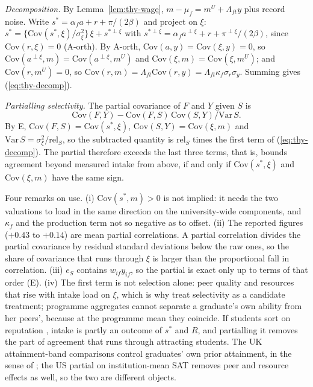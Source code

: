 \emph{Decomposition.} By Lemma~\ref{lem:thy-wage}, $m-\mu_f=m^U+\Lambda_{ft}y$ plus record noise. Write
$s^*=\alpha_fa+r+\pi/(2\beta)$ and project on $\xi$:
$s^*=\{\mathrm{Cov}(s^*,\xi)/\sigma_\xi^2\}\,\xi+s^{*\perp\xi}$ with
$s^{*\perp\xi}=\alpha_fa^{\perp\xi}+r+\pi^{\perp\xi}/(2\beta)$, since $\mathrm{Cov}(r,\xi)=0$ (A-orth). By A-orth,
$\mathrm{Cov}(a,y)=\mathrm{Cov}(\xi,y)=0$, so $\mathrm{Cov}(a^{\perp\xi},m)=\mathrm{Cov}(a^{\perp\xi},m^U)$ and
$\mathrm{Cov}(\xi,m)=\mathrm{Cov}(\xi,m^U)$; and $\mathrm{Cov}(r,m^U)=0$, so
$\mathrm{Cov}(r,m)=\Lambda_{ft}\mathrm{Cov}(r,y)=\Lambda_{ft}\kappa_f\sigma_r\sigma_y$. Summing gives
(\ref{eq:thy-decomp}).

\emph{Partialling selectivity.} The partial covariance of $F$ and $Y$ given $S$ is
\[
\mathrm{Cov}(F,Y)-\mathrm{Cov}(F,S)\,\mathrm{Cov}(S,Y)/\mathrm{Var}\,S.
\]
By E, $\mathrm{Cov}(F,S)=\mathrm{Cov}(s^*,\xi)$,
$\mathrm{Cov}(S,Y)=\mathrm{Cov}(\xi,m)$ and $\mathrm{Var}\,S=\sigma_\xi^2/\mathrm{rel}_S$, so the subtracted quantity
is $\mathrm{rel}_S$ times the first term of (\ref{eq:thy-decomp}). The partial therefore exceeds the last three
terms, that is, bounds agreement beyond measured intake from above, if and only if $\mathrm{Cov}(s^*,\xi)$ and
$\mathrm{Cov}(\xi,m)$ have the same sign. \thyqed

Four remarks on use. (i) $\mathrm{Cov}(s^*,m)>0$ is not implied: it needs the two valuations to load in the same
direction on the university-wide components, and $\kappa_f$ and the production term not so negative as to offset.
(ii) The reported figures ($+0.43$ to $+0.14$) are mean partial correlations. A partial correlation divides the
partial covariance by residual standard deviations below the raw ones, so the share of covariance that runs through
$\xi$ is larger than the proportional fall in correlation. (iii) $e_S$ contains $w_{if}y_{if}$, so the partial is
exact only up to terms of that order (E). (iv) The first term is not selection alone: peer quality and resources
that rise with intake load on $\xi$, which is why \citet{dale2002estimating} treat selectivity as a candidate
treatment; programme aggregates cannot separate a graduate's own ability from her peers', because at the programme
mean they coincide. If students sort on reputation \citep{macleod2015reputation}, intake is partly an outcome of
$s^*$ and $R$, and partialling it removes the part of agreement that runs through attracting students. The UK
attainment-band comparisons control graduates' own prior attainment, in the sense of \citet{macleod2017big}; the US
partial on institution-mean SAT removes peer and resource effects as well, so the two are different objects.

